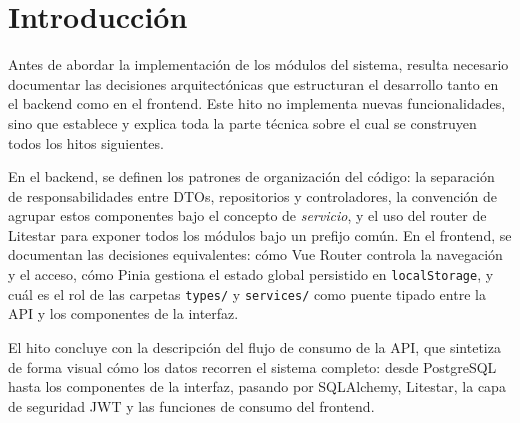 \section{Introducción}

Antes de abordar la implementación de los módulos del sistema, resulta necesario 
documentar las decisiones arquitectónicas que estructuran el desarrollo tanto en el 
backend como en el frontend. Este hito no implementa nuevas funcionalidades, sino que 
establece y explica toda la parte técnica sobre el cual se construyen todos los hitos 
siguientes.

En el backend, se definen los patrones de organización del código: la separación de 
responsabilidades entre DTOs, repositorios y controladores, la convención de agrupar 
estos componentes bajo el concepto de \textit{servicio}, y el uso del router de 
Litestar para exponer todos los módulos bajo un prefijo común. En el frontend, se 
documentan las decisiones equivalentes: cómo Vue Router controla la navegación y el 
acceso, cómo Pinia gestiona el estado global persistido en \texttt{localStorage}, 
y cuál es el rol de las carpetas \texttt{types/} y \texttt{services/} como puente 
tipado entre la API y los componentes de la interfaz.

El hito concluye con la descripción del flujo de consumo de la API, que sintetiza 
de forma visual cómo los datos recorren el sistema completo: desde PostgreSQL hasta 
los componentes de la interfaz, pasando por SQLAlchemy, Litestar, la capa de 
seguridad JWT y las funciones de consumo del frontend.